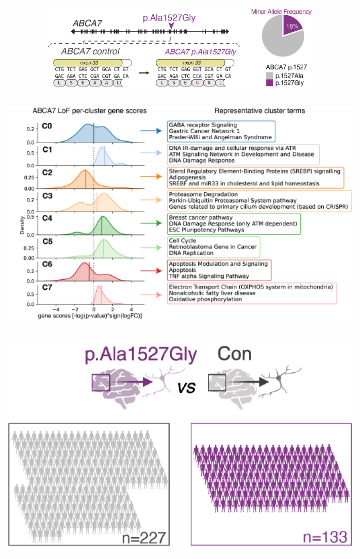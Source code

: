 \begin{figure}[ht]
\begin{subfigure}[t]{0.45\textwidth}
\begin{subfigure}[t]{0.49\textwidth}
        \end{subfigure}
        \begin{subfigure}[t]{\textwidth}
            \caption{}
            \includegraphics[width=\textwidth]{./main_plots/common_variant_cartoon.png}        
        \end{subfigure}
    \end{subfigure}
    \begin{subfigure}[t]{0.55\textwidth}
        \caption{}
        \includegraphics[width=\textwidth]{./main_plots/kl_densities.png}        
    \end{subfigure}
    \begin{subfigure}[t]{0.3\textwidth}
        \caption{}
        \includegraphics[width=\textwidth]{./main_plots/common_var_cohort_cartoon.png}        

\end{subfigure}
\end{figure}

